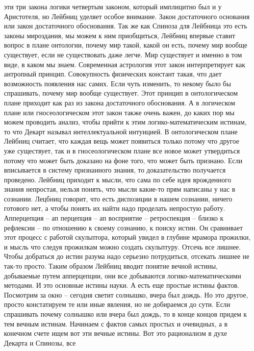 \documentclass[a4paper, 12pt]{article}
\begin{document}
эти три закона логики четвертым законом, который имплицитно был 
и у Аристотеля, но Лейбниц уделяет особое внимание. Закон достаточного 
основания или закон достаточного обоснования. Так же как Спиноза для 
Лейбница это есть законы мироздания, мы можем к ним приобщиться, Лейбниц 
впервые ставит вопрос в плане онтологии, почему мир такой, какой он 
есть, почему мир вообще существует, если не существовать даже легче. Мир 
существует и именно в том виде, в каком мы знаем. Современная астрология 
этот закон интерпретирует как антропный принцип. Совокупность физических 
констант такая, что дает возможность появления нас самих. Если чуть 
изменить, то некому было бы спрашивать, почему мир вообще существует. 
Этот принцип в онтологическом плане приходит как раз из закона 
достаточного обоснования. А в логическом плане или гносеологическом этот 
закон также очень важен, до каких пор мы можем проводить анализ, чтобы 
прийти к этим логико-математическим истинам, то что Декарт называл 
интеллектуальной интуицией. В онтологическом плане Лейбниц считает, что 
каждая вещь может появиться только потому что другое уже существует, так 
и в гносеологическом плане все новое может утвердиться потому что может 
быть доказано на фоне того, что может быть признано. Если вписывается 
в систему признанного знания, то доказательство получается проведено. 
Лейбниц приходит к мысли, что сама по себе идея врожденного знания 
непростая, нельзя понять, что мысли какие-то прям написаны у нас 
в сознании. Лецбниц говорит, что есть диспозиции в нашем сознании, 
ничего готового нет, а чтобы понять их найти надо проделать непростую 
работу. Апперцепция -- ап перцепция -- ап восприятие -- ретроспекция -- 
близко к рефлексии -- по отношению к своему сознанию, к поиску истин. Он 
сравнивает этот процесс с работой скульптора, который увидел в глубине 
мрамора прожилки, и мысль что следуя прожилкам можно создать скульптуру. 
Отсечь все лишнее. Чтобы добраться до истин разума надо серьезно 
потрудиться, отсекать лишнее не так-то просто. Таким образом Лейбниц 
вводит понятие вечной истины, добываемые путем апперцепции, они все 
добываются логико-математическими методами. И это основные истины науки. 
А есть еще простые истины фактов. Посмотрим за окно -- сегодня светит 
солнышко, вчера был дождь. Но это другое, просто констатируем те или 
иные явления, но не добираемся до сути. Если спрашивать почему солнышко 
или вчера был дождь, то в конце концов придем к тем вечным истинам. 
Начинаем с фактов самых простых и очевидных, а в конечном счете ищем вот 
эти вечные истины. Вот это рационализм в духе Декарта и Спинозы, все 
\end{document}
